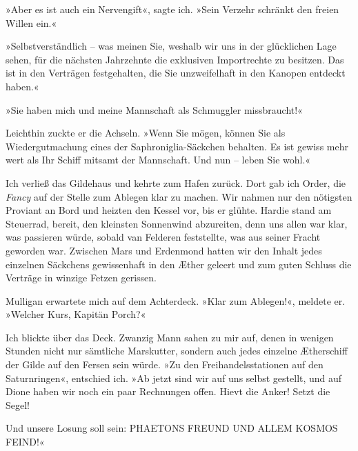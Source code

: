 »Aber es ist auch ein Nervengift«, sagte ich. »Sein Verzehr
schränkt den freien Willen ein.«

»Selbstverständlich – was meinen Sie, weshalb wir uns in der
glücklichen Lage sehen, für die nächsten Jahrzehnte die exklusiven
Importrechte zu besitzen. Das ist in den Verträgen festgehalten,
die Sie unzweifelhaft in den Kanopen entdeckt haben.«

»Sie haben mich und meine Mannschaft als Schmuggler missbraucht!«

Leichthin zuckte er die Achseln. »Wenn Sie mögen, können Sie als
Wiedergutmachung eines der Saphroniglia-Säckchen behalten. Es ist
gewiss mehr wert als Ihr Schiff mitsamt der Mannschaft. Und nun –
leben Sie wohl.«

\bigpar

Ich verließ das Gildehaus und kehrte zum Hafen zurück. Dort gab ich
Order, die \emph{Fancy} auf der Stelle zum Ablegen klar zu machen.
Wir nahmen nur den nötigsten Proviant an Bord und heizten den
Kessel vor, bis er glühte. Hardie stand am Steuerrad, bereit, den
kleinsten Sonnenwind abzureiten, denn uns allen war klar, was
passieren würde, sobald van Felderen feststellte, was aus seiner
Fracht geworden war. Zwischen Mars und Erdenmond hatten wir den
Inhalt jedes einzelnen Säckchens gewissenhaft in den Æther geleert
und zum guten Schluss die Verträge in winzige Fetzen gerissen.

\bigpar

Mulligan erwartete mich auf dem Achterdeck. »Klar zum Ablegen!«,
meldete er. »Welcher Kurs, Kapitän Porch?«

Ich blickte über das Deck. Zwanzig Mann sahen zu mir auf, denen in
wenigen Stunden nicht nur sämtliche Marskutter, sondern auch jedes
einzelne Ætherschiff der Gilde auf den Fersen sein würde. »Zu den
Freihandelsstationen auf den Saturnringen«, entschied ich. »Ab
jetzt sind wir auf uns selbst gestellt, und auf Dione haben wir
noch ein paar Rechnungen offen. Hievt die Anker! Setzt die Segel!

\bigpar

Und unsere Losung soll sein: PHAETONS FREUND UND ALLEM KOSMOS
FEIND!«


